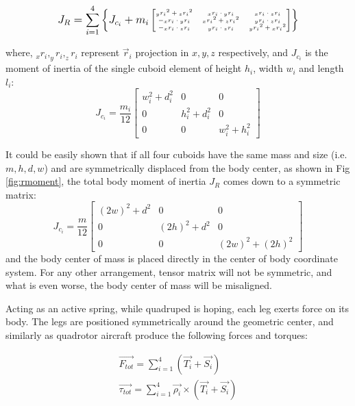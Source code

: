 \begin{equation}
\tiny
J_R=\sum_{i=1}^{4}\left \{J_{c_i}+m_i\begin{bmatrix}
{_yr_i}^2+{_zr_i}^2 & {_xr_i}\cdot {_yr_i} & {_xr_i}\cdot {_zr_i} \\ 
-{_xr_i}\cdot {_yr_i} & {_xr_i}^2+{_zr_i}^2 & {_yr_i}\cdot {_zr_i}\\ 
-{_xr_i}\cdot {_zr_i} & {_yr_i}\cdot {_zr_i} & {_yr_i}^2+{_xr_i}^2
\end{bmatrix} \right \}
\normalsize
\end{equation}

where, $_xr_i, _yr_i, _zr_i$ represent $\vec{r}_i$ projection in $x,y,z$ respectively, and $J_{c_i}$ is the moment of inertia of the single cuboid element of height $h_i$, width $w_i$ and length $l_i$:
\begin{equation}
J_{c_i}=\frac{m_i}{12}\begin{bmatrix}
w_i^2+d_i^2 &0&0 \\ 
0 &h_i^2+d_i^2&0\\ 
0 &0& w_i^2+h_i^2
\end{bmatrix}
\end{equation} 

It could be easily shown that if all four cuboids have the same mass and size (i.e. $m,h,d,w$) and are symmetrically displaced from the body center, as shown in Fig \ref{fig:rmoment}, the total body moment of inertia $J_R$ comes down to a symmetric matrix: 
\begin{equation}
J_{c_i}=\frac{m}{12}\begin{bmatrix}
(2w)^2+d^2 &0&0 \\ 
0 &(2h)^2+d^2&0\\ 
0 &0& (2w)^2+(2h)^2
\end{bmatrix}
\end{equation} 
and the body center of mass is placed directly in the center of body coordinate system. For any other arrangement, tensor matrix will not be symmetric, and what is even worse, the body center of mass will be misaligned.

Acting as an active spring, while quadruped is hoping, each leg exerts force on its body. The legs are positioned symmetrically around the geometric center, and similarly as quadrotor aircraft produce the following forces and torques:

\begin{gather}\label{eq:Forces}
\vec{F_{tot}}=\sum_{i=1}^{4}(\vec{T_{i}}+\vec{S_{i}})\\
\vec{\tau_{tot}}=\sum_{i=1}^{4}\vec{\rho _i}\times(\vec{T_{i}}+\vec{S_{i}})
\end{gather}  

